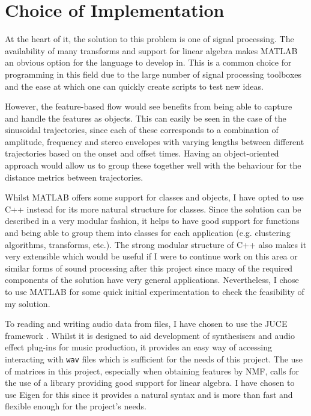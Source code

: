 \documentclass[10pt,twoside,a4paper]{report}
\begin{document}
\section{Choice of Implementation}

At the heart of it, the solution to this problem is one of signal processing. The availability of many transforms and support for linear algebra makes MATLAB an obvious option for the language to develop in. This is a common choice for programming in this field due to the large number of signal processing toolboxes and the ease at which one can quickly create scripts to test new ideas.

However, the feature-based flow would see benefits from being able to capture and handle the features as objects. This can easily be seen in the case of the sinusoidal trajectories, since each of these corresponds to a combination of amplitude, frequency and stereo envelopes with varying lengths between different trajectories based on the onset and offset times. Having an object-oriented approach would allow us to group these together well with the behaviour for the distance metrics between trajectories.

Whilst MATLAB offers some support for classes and objects, I have opted to use C++ instead for its more natural structure for classes. Since the solution can be described in a very modular fashion, it helps to have good support for functions and being able to group them into classes for each application (e.g. clustering algorithms, transforms, etc.). The strong modular structure of C++ also makes it very extensible which would be useful if I were to continue work on this area or similar forms of sound processing after this project since many of the required components of the solution have very general applications. Nevertheless, I chose to use MATLAB for some quick initial experimentation to check the feasibility of my solution.

To reading and writing audio data from files, I have chosen to use the JUCE framework \cite{juce}. Whilst it is designed to aid development of synthesisers and audio effect plug-ins for music production, it provides an easy way of accessing interacting with \texttt{wav} files which is sufficient for the needs of this project. The use of matrices in this project, especially when obtaining features by NMF, calls for the use of a library providing good support for linear algebra. I have chosen to use Eigen for this since it provides a natural syntax and is more than fast and flexible enough for the project's needs.
\end{document}
